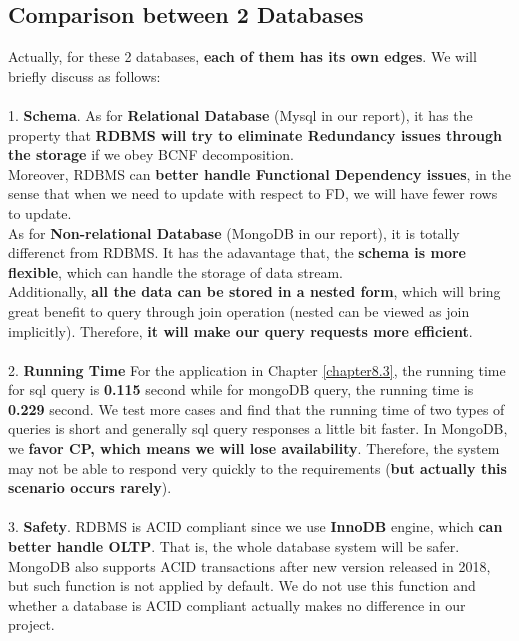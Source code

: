 \documentclass{article}
\begin{document}
	\subsection{Comparison between 2 Databases}
	Actually, for these 2 databases, \textbf{each of them has its own edges}. We will briefly discuss as follows:
	\vspace{3pt}
	\\
	\\
	1. \textbf{Schema}. As for \textbf{Relational Database} (Mysql in our report), it has the property that \textbf{RDBMS will try to eliminate Redundancy issues through the storage} if we obey BCNF decomposition. 
	\\
	Moreover, RDBMS can \textbf{better handle Functional Dependency issues}, in the sense that when we need to update with respect to FD, we will have fewer rows to update.
	\\
	As for \textbf{Non-relational Database} (MongoDB in our report), it is totally differenct from RDBMS. It has the adavantage that, the \textbf{schema is more flexible}, which can handle the storage of data stream. 
	\\
	Additionally, \textbf{all the data can be stored in a nested form}, which will bring great benefit to query through join operation (nested can be viewed as join implicitly). Therefore, \textbf{it will make our query requests more efficient}.
	\\
	\\
	2. \textbf{Running Time}
	For the application in Chapter \ref{chapter8.3}, the running time for sql query is  \textbf{0.115} second while for mongoDB query, the running time is  \textbf{0.229} second. We test more cases and find that the running time of two types of queries is short and generally sql query responses a little bit faster. In MongoDB, we \textbf{favor CP, which means we will lose availability}. Therefore, the system may not be able to respond very quickly to the requirements (\textbf{but actually this scenario occurs rarely}).
	\\
	\\
	3. \textbf{Safety}. RDBMS is ACID compliant since we use \textbf{InnoDB} engine, which \textbf{can better handle OLTP}. That is, the whole database system will be safer.
	\vspace{3pt}
	\\
	MongoDB also supports ACID transactions after new version released in 2018, but such function is not applied by default. We do not use this function and whether a database is ACID compliant actually makes no difference in our project. 
	
\end{document}
